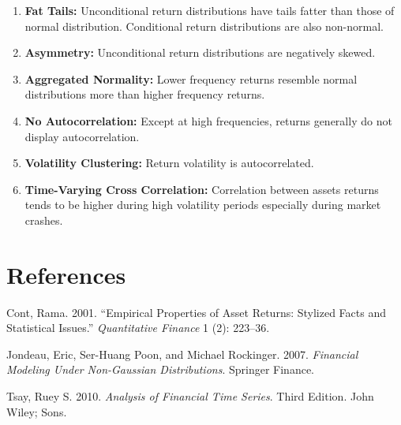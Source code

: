 \documentclass[11pt,]{article}
\providecommand{\tightlist}{%
  \setlength{\itemsep}{0pt}\setlength{\parskip}{0pt}}
\begin{document}
\begin{enumerate}
\def\labelenumi{\arabic{enumi}.}
\tightlist
\item
  \textbf{Fat Tails:} Unconditional return distributions have tails
  fatter than those of normal distribution. Conditional return
  distributions are also non-normal.
\item
  \textbf{Asymmetry:} Unconditional return distributions are negatively
  skewed.
\item
  \textbf{Aggregated Normality:} Lower frequency returns resemble normal
  distributions more than higher frequency returns.
\item
  \textbf{No Autocorrelation:} Except at high frequencies, returns
  generally do not display autocorrelation.
\item
  \textbf{Volatility Clustering:} Return volatility is autocorrelated.
\item
  \textbf{Time-Varying Cross Correlation:} Correlation between assets
  returns tends to be higher during high volatility periods especially
  during market crashes.
\end{enumerate}

\section*{References}\label{references}

\hypertarget{refs}{}
\hypertarget{ref-Cont:2001}{}
Cont, Rama. 2001. ``Empirical Properties of Asset Returns: Stylized
Facts and Statistical Issues.'' \emph{Quantitative Finance} 1 (2):
223--36.

\hypertarget{ref-Jondeau_Poon_Rockinger:2007}{}
Jondeau, Eric, Ser-Huang Poon, and Michael Rockinger. 2007.
\emph{Financial Modeling Under Non-Gaussian Distributions}. Springer
Finance.

\hypertarget{ref-Tsay:2010}{}
Tsay, Ruey S. 2010. \emph{Analysis of Financial Time Series}. Third
Edition. John Wiley; Sons.
\end{document}
